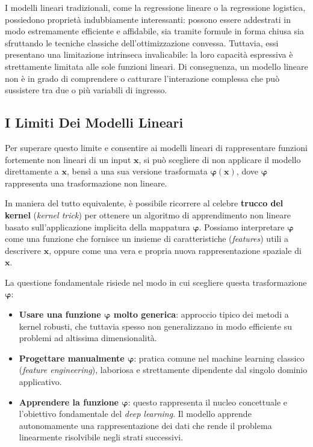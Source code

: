﻿\documentclass[11pt, a4paper]{article}
\begin{document}
I modelli lineari tradizionali, come la regressione lineare o la regressione logistica, possiedono proprietà indubbiamente interessanti: possono essere addestrati in modo estremamente efficiente e affidabile, sia tramite formule in forma chiusa sia sfruttando le tecniche classiche dell'ottimizzazione convessa. Tuttavia, essi presentano una limitazione intrinseca invalicabile: la loro capacità espressiva è strettamente limitata alle sole funzioni lineari. Di conseguenza, un modello lineare non è in grado di comprendere o catturare l'interazione complessa che può sussistere tra due o più variabili di ingresso.

\subsection{I Limiti Dei Modelli Lineari}

Per superare questo limite e consentire ai modelli lineari di rappresentare funzioni fortemente non lineari di un input $\bm{x}$, si può scegliere di non applicare il modello direttamente a $\bm{x}$, bensì a una sua versione trasformata $\bm{\varphi}(\bm{x})$, dove $\bm{\varphi}$ rappresenta una trasformazione non lineare.

In maniera del tutto equivalente, è possibile ricorrere al celebre \textbf{trucco del kernel} (\emph{kernel trick}) per ottenere un algoritmo di apprendimento non lineare basato sull'applicazione implicita della mappatura $\bm{\varphi}$. Possiamo interpretare $\bm{\varphi}$ come una funzione che fornisce un insieme di caratteristiche (\emph{features}) utili a descrivere $\bm{x}$, oppure come una vera e propria nuova rappresentazione spaziale di $\bm{x}$.

La questione fondamentale risiede nel modo in cui scegliere questa trasformazione $\bm{\varphi}$:
\begin{itemize}[noitemsep]
    \item \textbf{Usare una funzione $\bm{\varphi}$ molto generica}: approccio tipico dei metodi a kernel robusti, che tuttavia spesso non generalizzano in modo efficiente su problemi ad altissima dimensionalità.
    \item \textbf{Progettare manualmente $\bm{\varphi}$}: pratica comune nel machine learning classico (\emph{feature engineering}), laboriosa e strettamente dipendente dal singolo dominio applicativo.
    \item \textbf{Apprendere la funzione $\bm{\varphi}$}: questo rappresenta il nucleo concettuale e l'obiettivo fondamentale del \emph{deep learning}. Il modello apprende autonomamente una rappresentazione dei dati che rende il problema linearmente risolvibile negli strati successivi.
\end{itemize}
\end{document}
